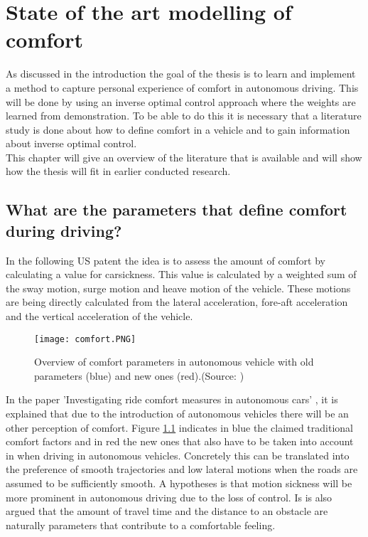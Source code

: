 \chapter{State of the art modelling of comfort}
\label{cha:1}

As discussed in the introduction the goal of the thesis is to learn and implement a method to capture personal experience of comfort in autonomous driving. This will be done by using an inverse optimal control approach where the weights are learned from demonstration. To be able to do this it is necessary that a literature study is done about how to define comfort in a vehicle and to gain information about inverse optimal control.\\
This chapter will give an overview of the literature that is available and will show how the thesis will fit in earlier conducted research.

\section{What are the parameters that define comfort during driving?}
In the following US patent \cite{Daniel2018} the idea is to assess the amount of comfort by calculating a value for carsickness. This value is calculated by a weighted sum of the sway motion, surge motion and heave motion of the vehicle. These motions are being directly calculated from the lateral acceleration, fore-aft acceleration and the vertical acceleration of the vehicle. \\

\begin{figure}[h!]
	\centering
	\texttt{[image: comfort.PNG]}
	\caption{Overview of comfort parameters in autonomous vehicle with old parameters (blue) and new ones (red).(Source: \cite{Elbanhawi2015})}
	\label{fig:Comfort}
\end{figure} 

In the paper 'Investigating ride comfort measures in autonomous cars' \cite{Elbanhawi2015}, it is explained that due to the introduction of autonomous vehicles there will be an other perception of comfort. Figure \ref{fig:Comfort} indicates in blue the claimed traditional comfort factors and in red the new ones that also have to be taken into account in when driving in autonomous vehicles. Concretely this can be translated into the preference of smooth trajectories and low lateral motions when the roads are assumed to be sufficiently smooth. A hypotheses is that motion sickness will be more prominent in autonomous driving due to the loss of control. Is is also argued that the amount of travel time and the distance to an obstacle are naturally parameters that contribute to a comfortable feeling. \\

